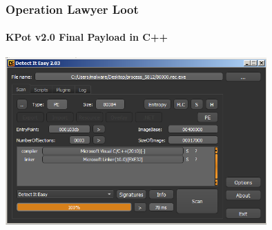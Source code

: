 \documentclass[aspectratio=169]{beamer}
\begin{document}
{
\begin{frame}
  \frametitle{Operation Lawyer Loot}
  \framesubtitle{KPot v2.0 Final Payload in C++}
  \begin{center}
    \includegraphics[width=10cm]{kpot-unpacking-13}
  \end{center}
\end{frame}
}
\end{document}
